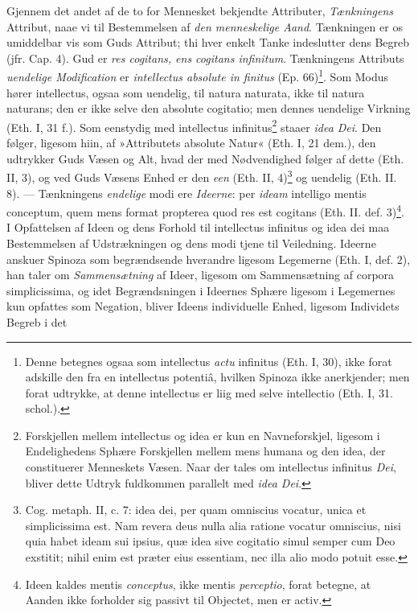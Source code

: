 \documentclass[12pt,a4paper]{book}
\newcommand{\opage}[1]{\marginnote{\footnotesize\textit{[#1]}}}
\begin{document}
Gjennem det andet af de to for Mennesket bekjendte
Attributer, \emph{Tænkningens} Attribut, naae vi til Bestemmelsen
af \emph{den menneskelige Aand}. Tænkningen er os umiddelbar
vis som Guds Attribut; thi hver enkelt Tanke indeslutter dens
Begreb (jfr. Cap. 4). Gud er \emph{res cogitans, ens cogitans
infinitum}. Tænkningens Attributs \emph{uendelige Modification}
er \emph{intellectus absolute in\-%
\opage{83}\setcounter{footnote}{0}%
finitus} (Ep. 66)\footnote{Denne betegnes ogsaa som intellectus
\emph{actu} infinitus (Eth. I, 30), ikke forat adskille den fra en
intellectus potentiâ, hvilken Spinoza ikke anerkjender; men
forat udtrykke, at denne intellectus er liig med selve intellectio
(Eth. I, 31. schol.).}. Som Modus hører intellectus, ogsaa
som uendelig, til natura naturata, ikke til natura naturans;
den er ikke selve den absolute cogitatio; men dennes uendelige
Virkning (Eth. I, 31 f.). Som eenstydig med intellectus
infinitus\footnote{Forskjellen mellem intellectus og idea er kun
en Navneforskjel, ligesom i Endelighedens Sphære Forskjellen
mellem mens humana og den idea, der constituerer Menneskets
Væsen. Naar der tales om intellectus infinitus \emph{Dei}, bliver
dette Udtryk fuldkommen parallelt med \emph{idea Dei}.} staaer \emph{idea
Dei}. Den følger, ligesom hiin, af »Attributets absolute Natur«
(Eth. I, 21 dem.), den udtrykker Guds Væsen og Alt, hvad der
med Nødvendighed følger af dette (Eth. II, 3), og ved Guds
Væsens Enhed er den \emph{een} (Eth. II, 4)\footnote{Cog. metaph. II,
c. 7: idea dei, per quam omniscius vocatur, unica et
simplicissima est. Nam revera deus nulla alia ratione vocatur
omniscius, nisi quia habet ideam sui ipsius, quæ idea sive
cogitatio simul semper cum Deo exstitit; nihil enim est præter
eius essentiam, nec illa alio modo potuit esse.} og uendelig
(Eth. II. 8). --- Tænkningens \emph{endelige} modi ere \emph{Ideerne}: per
\emph{ideam} intelligo mentis conceptum, quem mens format propterea
quod res est cogitans (Eth. II. def. 3)\footnote{Ideen kaldes
mentis \emph{conceptus}, ikke mentis \emph{perceptio}, forat betegne, at
Aanden ikke forholder sig passivt til Objectet, men er activ.}.
I Opfattelsen af Ideen og dens Forhold til intellectus infinitus
og idea dei maa Bestemmelsen af Udstrækningen og dens modi
tjene til Veiledning. Ideerne anskuer Spinoza som begrændsende
hverandre ligesom Legemerne (Eth. I, def. 2), han taler om
\emph{Sammensætning} af Ideer, ligesom om Sammensætning af
corpora simplicissima, og idet Begrændsningen i Ideernes
Sphære ligesom i Legemernes kun opfattes som Negation, bliver
Ideens individuelle Enhed, ligesom Individets Begreb i det
\end{document}
